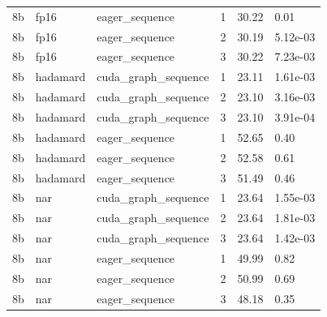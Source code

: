 {\begin{longtable}{llllll}
8b & fp16 & eager\_sequence & 1 & 30.22 & 0.01 \\
8b & fp16 & eager\_sequence & 2 & 30.19 & 5.12e-03 \\
8b & fp16 & eager\_sequence & 3 & 30.22 & 7.23e-03 \\
8b & hadamard & cuda\_graph\_sequence & 1 & 23.11 & 1.61e-03 \\
8b & hadamard & cuda\_graph\_sequence & 2 & 23.10 & 3.16e-03 \\
8b & hadamard & cuda\_graph\_sequence & 3 & 23.10 & 3.91e-04 \\
8b & hadamard & eager\_sequence & 1 & 52.65 & 0.40 \\
8b & hadamard & eager\_sequence & 2 & 52.58 & 0.61 \\
8b & hadamard & eager\_sequence & 3 & 51.49 & 0.46 \\
8b & nar & cuda\_graph\_sequence & 1 & 23.64 & 1.55e-03 \\
8b & nar & cuda\_graph\_sequence & 2 & 23.64 & 1.81e-03 \\
8b & nar & cuda\_graph\_sequence & 3 & 23.64 & 1.42e-03 \\
8b & nar & eager\_sequence & 1 & 49.99 & 0.82 \\
8b & nar & eager\_sequence & 2 & 50.99 & 0.69 \\
8b & nar & eager\_sequence & 3 & 48.18 & 0.35 \\
\bottomrule
\end{longtable}
}
